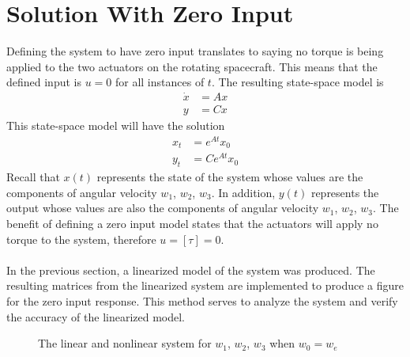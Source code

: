 \documentclass[12pt]{article}
\begin{document}
\section{Solution With Zero Input}
Defining the system to have zero input translates to saying no torque is being applied to the two actuators on the rotating spacecraft. This means that the defined input is $u=0$ for all instances of $t$. The resulting state-space model is
\begin{align*}
\dot{x} &= Ax \\
y &= Cx
\end{align*}
This state-space model will have the solution
\begin{equation}
\begin{aligned}
x_{t} &= e^{At}x_{0} \\
y_{t} &= Ce^{At}x_{0}
\end{aligned}
\end{equation}
Recall that $x(t)$ represents the state of the system whose values are the components of angular velocity $w_{1}$, $w_{2}$, $w_{3}$. In addition, $y(t)$ represents the output whose values are also the components of angular velocity $w_{1}$, $w_{2}$, $w_{3}$. The benefit of defining a zero input model states that the actuators will apply no torque to the system, therefore $u =[\tau] = 0$. 
\\ \\
In the previous section, a linearized model of the system was produced. The resulting matrices from the linearized system are implemented to produce a figure for the zero input response. This method serves to analyze the system and verify the accuracy of the linearized model.
\begin{figure}[h!]
\centering
{}
\caption{The linear and nonlinear system for $w_{1}$, $w_{2}$, $w_{3}$ when $w_{0} = w_{e}$}
\label{fig:1}
\end{figure}
\end{document}
